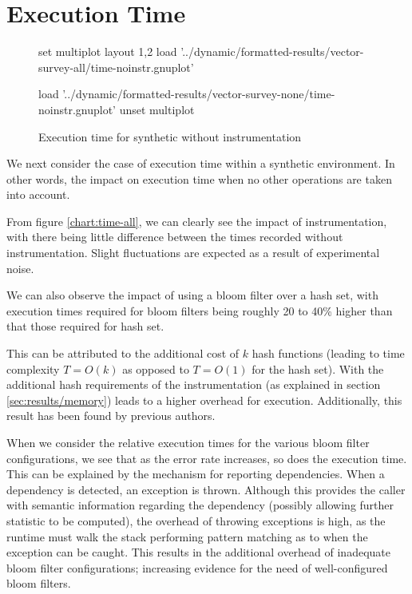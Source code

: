 \section{Execution Time} \label{sec:results/time}
\begin{figure}
	\centering
	\begin{gnuplot}[terminal=pdf]
	set multiplot layout 1,2
		load '../dynamic/formatted-results/vector-survey-all/time-noinstr.gnuplot'
		
		load '../dynamic/formatted-results/vector-survey-none/time-noinstr.gnuplot'
	unset multiplot
	\end{gnuplot}
	\caption{Execution time for synthetic without instrumentation}
	\label{chart:time-none-noinstr}
\end{figure}

We next consider the case of execution time within a synthetic environment. In other words, the impact on execution time when no other operations are taken into account.

From figure \ref{chart:time-all}, we can clearly see the impact of instrumentation, with there being little difference between the times recorded without instrumentation. Slight fluctuations are expected as a result of experimental noise.

We can also observe the impact of using a bloom filter over a hash set, with execution times required for bloom filters being roughly 20 to 40\% higher than that those required for hash set.

This can be attributed to the additional cost of $k$ hash functions (leading to time complexity $T=O(k)$ as opposed to $T=O(1)$ for the hash set). With the additional hash requirements of the instrumentation (as explained in section \ref{sec:results/memory}) leads to a higher overhead for execution. Additionally, this result has been found by previous authors.

When we consider the relative execution times for the various bloom filter configurations, we see that as the error rate increases, so does the execution time. This can be explained by the mechanism for reporting dependencies. When a dependency is detected, an exception is thrown. Although this provides the caller with semantic information regarding the dependency (possibly allowing further statistic to be computed), the overhead of throwing exceptions is high, as the runtime must walk the stack performing pattern matching as to when the exception can be caught. This results in the additional overhead of inadequate bloom filter configurations; increasing evidence for the need of well-configured bloom filters.

